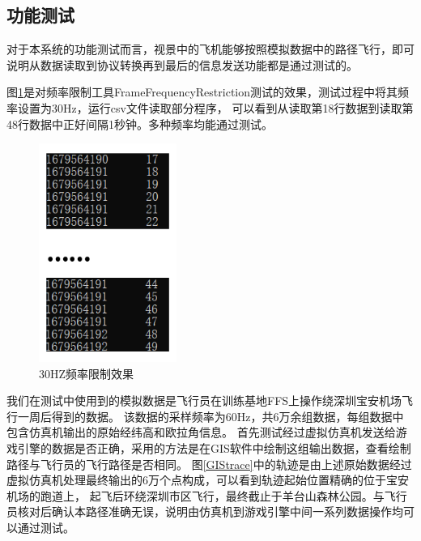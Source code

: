 \subsection{功能测试}
对于本系统的功能测试而言，视景中的飞机能够按照模拟数据中的路径飞行，即可说明从数据读取到协议转换再到最后的信息发送功能都是通过测试的。
\par 
图\ref{synctest}是对频率限制工具FrameFrequencyRestriction测试的效果，测试过程中将其频率设置为30Hz，运行csv文件读取部分程序，
可以看到从读取第18行数据到读取第48行数据中正好间隔1秒钟。多种频率均能通过测试。
\clearpage
\begin{figure}[h!]
    \begin{center}
        \includegraphics[width=0.4\textwidth]{pictures/frame.png}
        \caption{30HZ频率限制效果}
        \label{synctest}
    \end{center}
\end{figure}
\par
我们在测试中使用到的模拟数据是飞行员在训练基地FFS上操作绕深圳宝安机场飞行一周后得到的数据。
该数据的采样频率为60Hz，共6万余组数据，每组数据中包含仿真机输出的原始经纬高和欧拉角信息。
首先测试经过虚拟仿真机发送给游戏引擎的数据是否正确，采用的方法是在GIS软件中绘制这组输出数据，查看绘制路径与飞行员的飞行路径是否相同。
图\ref{GIStrace}中的轨迹是由上述原始数据经过虚拟仿真机处理最终输出的6万个点构成，可以看到轨迹起始位置精确的位于宝安机场的跑道上，
起飞后环绕深圳市区飞行，最终截止于羊台山森林公园。与飞行员核对后确认本路径准确无误，说明由仿真机到游戏引擎中间一系列数据操作均可以通过测试。

